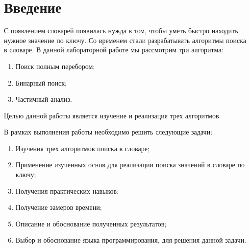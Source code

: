 \newpage
\chapter*{Введение}

С появлением словарей появилась нужда в том, чтобы уметь быстро
находить нужное значение по ключу. Со временем стали разрабатывать
алгоритмы поиска в словаре. В данной лабораторной работе мы рассмотрим
три алгоритма:

\begin{enumerate}
	\item Поиск полным перебором;
	\item Бинарный поиск;
	\item Частичный анализ.
\end{enumerate}


Целью данной работы является изучение и реализация трех алгоритмов.

В рамках выполнения работы необходимо решить следующие задачи:

\begin{enumerate}
	\item Изучения трех алгоритмов поиска в словаре;
	\item Применение изученных основ для реализации поиска значений в словаре по ключу;
	\item Получения практических навыков;
	\item Получение замеров времени;
	\item Описание и обоснование полученных результатов;
	\item Выбор и обоснование языка программирования, для решения данной задачи.
\end{enumerate}